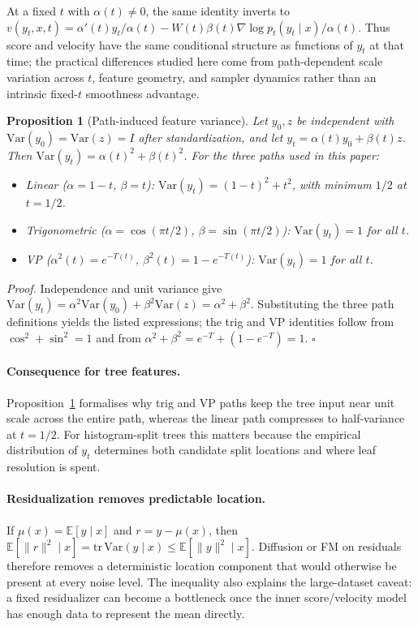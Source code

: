 \documentclass{tpm2026}
\newcommand{\E}{\mathbb{E}}
\newcommand{\Var}{\mathrm{Var}}
\newtheorem{proposition}{Proposition}
\begin{document}
At a fixed $t$ with $\alpha(t)\neq0$, the same identity inverts to $v(y_t,x,t)=\alpha'(t)y_t/\alpha(t)-W(t)\beta(t)\nabla\log p_t(y_t\mid x)/\alpha(t)$. Thus score and velocity have the same conditional structure as functions of $y_t$ at that time; the practical differences studied here come from path-dependent scale variation across $t$, feature geometry, and sampler dynamics rather than an intrinsic fixed-$t$ smoothness advantage.

\begin{proposition}[Path-induced feature variance]\label{prop:path-variance}
Let $y_0,z$ be independent with $\Var(y_0)=\Var(z)=I$ after standardization, and let $y_t=\alpha(t)y_0+\beta(t)z$. Then $\Var(y_t)=\alpha(t)^2+\beta(t)^2$. For the three paths used in this paper:
\begin{itemize}
  \item Linear ($\alpha=1-t$, $\beta=t$): $\Var(y_t)=(1-t)^2+t^2$, with minimum $1/2$ at $t=1/2$.
  \item Trigonometric ($\alpha=\cos(\pi t/2)$, $\beta=\sin(\pi t/2)$): $\Var(y_t)=1$ for all $t$.
  \item VP ($\alpha^2(t)=e^{-T(t)}$, $\beta^2(t)=1-e^{-T(t)}$): $\Var(y_t)=1$ for all $t$.
\end{itemize}
\end{proposition}
\emph{Proof.} Independence and unit variance give $\Var(y_t)=\alpha^2\Var(y_0)+\beta^2\Var(z)=\alpha^2+\beta^2$. Substituting the three path definitions yields the listed expressions; the trig and VP identities follow from $\cos^2+\sin^2=1$ and from $\alpha^2+\beta^2=e^{-T}+(1-e^{-T})=1$. \hfill$\square$

\paragraph{Consequence for tree features.} Proposition~\ref{prop:path-variance} formalises why trig and VP paths keep the tree input near unit scale across the entire path, whereas the linear path compresses to half-variance at $t=1/2$. For histogram-split trees this matters because the empirical distribution of $y_t$ determines both candidate split locations and where leaf resolution is spent.

\paragraph{Residualization removes predictable location.} If $\mu(x)=\E[y\mid x]$ and $r=y-\mu(x)$, then $\E[\|r\|^2\mid x]=\mathrm{tr}\,\Var(y\mid x)\leq \E[\|y\|^2\mid x]$. Diffusion or FM on residuals therefore removes a deterministic location component that would otherwise be present at every noise level. The inequality also explains the large-dataset caveat: a fixed residualizer can become a bottleneck once the inner score/velocity model has enough data to represent the mean directly.
\end{document}
